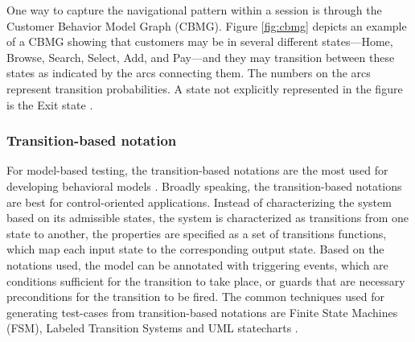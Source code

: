 \documentclass[espaco=umemeio,chapter=TITLE,twoside,openright]{abnt}
\begin{document}
One way to capture the navigational pattern within a session is through the Customer Behavior Model Graph (CBMG). Figure \ref{fig:cbmg} depicts an example of a CBMG showing that customers may be in several different states—Home, Browse, Search, Select, Add, and Pay—and they may transition between these states as indicated by the arcs connecting them. The numbers on the arcs represent transition probabilities. A state not explicitly represented in the figure is the Exit state \cite{Menasce2002a} \cite{Jiang2010} \cite{MohammadS.Obaidat}.



\subsubsection{Transition-based notation}


For model-based testing, the transition-based notations are the most used for developing behavioral models \cite{utting2010practical}. Broadly speaking, the
transition-based notations are best for control-oriented applications. Instead of characterizing the system based on its admissible states, the system is characterized as transitions from one state to another, the properties are specified as a set of transitions functions, which
map each input state to the corresponding output state. Based on the notations
used, the model can be annotated with triggering events, which are
conditions sufficient for the transition to take place, or guards that are necessary
preconditions for the transition to be fired. The common techniques used for generating test-cases from transition-based notations are Finite State Machines (FSM), Labeled Transition Systems and UML statecharts \cite{Marinescu2015}.
\end{document}
